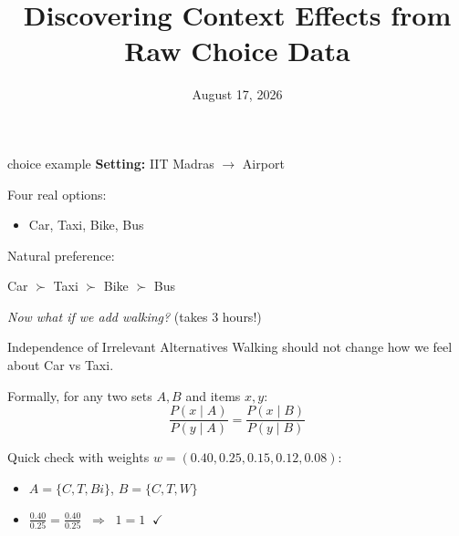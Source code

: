 \documentclass[aspectratio=169]{beamer}
\title{Discovering Context Effects from Raw Choice Data}
\subtitle{}
\author{}
\institute{}
\date{August 17, 2026}
\begin{document}
\begin{frame}
    \titlepage
\end{frame}

\begin{frame}{ choice example}
    \textbf{Setting:} IIT Madras $\rightarrow$ Airport

    \vspace{1em}

    Four real options:
    \begin{itemize}
        \item Car, Taxi, Bike, Bus
    \end{itemize}

    \vspace{0.5em}

    Natural preference:
    \begin{center}
        Car $\succ$ Taxi $\succ$ Bike $\succ$ Bus
    \end{center}

    \vspace{1em}

    \textit{Now what if we add walking?} \pause \hfill (takes 3 hours!)
\end{frame}
\begin{frame}{Independence of Irrelevant Alternatives}
    Walking should not change how we feel about Car vs Taxi.

    \vspace{0.5em}

    Formally, for any two sets $A, B$ and items $x, y$:
    \begin{equation*}
        \frac{P(x \mid A)}{P(y \mid A)} = \frac{P(x \mid B)}{P(y \mid B)}
    \end{equation*}

    \vspace{0.5em}

    Quick check with weights $w = (0.40, 0.25, 0.15, 0.12, 0.08)$:
    \begin{itemize}
        \item $A = \{C, T, Bi\}$, $B = \{C, T, W\}$
        \item $\frac{0.40}{0.25} = \frac{0.40}{0.25} \;\; \Rightarrow \;\; 1 = 1 \;\; \checkmark$
    \end{itemize}
\end{frame}
\end{document}

